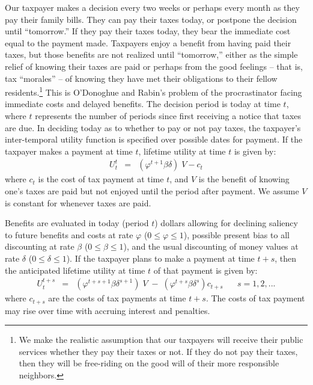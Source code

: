 Our taxpayer makes a decision every two weeks or perhaps every month
as they pay their family bills.  They can pay their taxes today, or
postpone the decision until ``tomorrow.''  If they pay their taxes
today, they bear the immediate cost equal to the payment made.
Taxpayers enjoy a benefit from having paid their taxes, but those
benefits are not realized until ``tomorrow,'' either as the simple
relief of knowing their taxes are paid or perhaps from the good
feelings -- that is, tax ``morales'' -- of knowing they have met their
obligations to their fellow residents.\footnote{ We make the realistic
  assumption that our taxpayers will receive their public services
  whether they pay their taxes or not.  If they do not pay their
  taxes, then they will be free-riding on the good will of their more
  responsible neighbors.  }  This is O'Donoghue and Rabin's problem of
the procrastinator facing immediate costs and delayed benefits. The
decision period is today at time $t$, where $t$ represents the number
of periods since first receiving a notice that taxes are due.  In
deciding today as to whether to pay or not pay taxes, the taxpayer's
inter-temporal utility function is specified over possible dates for
payment. If the taxpayer makes a payment at time $t$, lifetime
utility at time $t$ is given by:
\begin{eqnarray}\label{eq1}
U_t^t  &=& (\varphi^{t+1} \beta \delta) \;  V - c_ t 
\end{eqnarray}
where $c_t$ is the cost of tax payment at time $t$, and $V$ is the
benefit of knowing one's taxes are paid but not enjoyed until the
period after payment.  We assume $V$ is constant for whenever taxes
are paid. 

Benefits are evaluated in today (period $t$) dollars allowing for
declining saliency to future benefits and costs at rate $\varphi$ ($0
\le \varphi \le 1$), possible present bias to all discounting at rate
$\beta$ ($0 \le \beta \le 1$), and the usual discounting of money
values at rate $\delta$ ($0 \le \delta\le 1$).  If the taxpayer plans
to make a payment at time $t + s$, then the anticipated lifetime
utility at time $t$ of that payment is given by:
\begin{eqnarray}\label{eq2}
U_t^{t+s} &=& (\varphi^{t+s+1} \beta \delta^{s+1}) \; V \; - \; (\varphi^{t+s}
\beta \delta^{s}) c_ {t+s} \; \; \; \; \; \; s=1,2, ...
\end{eqnarray}
where $c_{t+s}$ are the costs of tax payments at time $t+s$. The costs
of tax payment may rise over time with accruing interest and
penalties.

